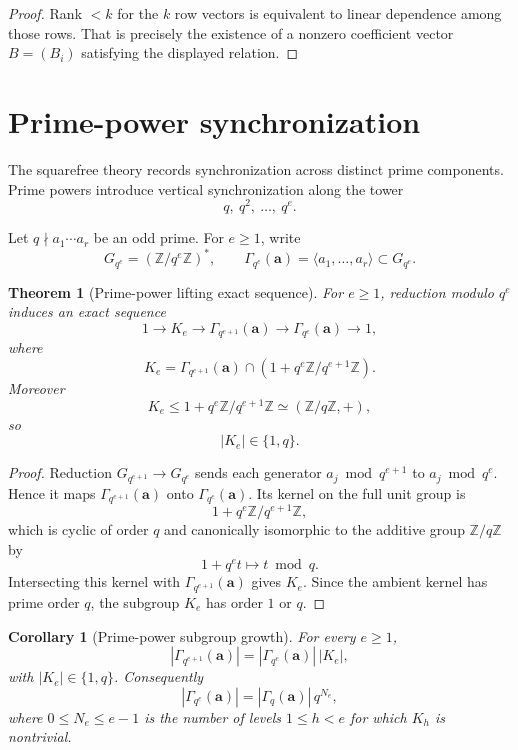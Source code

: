 \documentclass[11pt]{article}
\newtheorem{theorem}{Theorem}
\newtheorem{corollary}{Corollary}
\newcommand{\Z}{\mathbb Z}
\begin{document}
\begin{proof}
Rank \(<k\) for the \(k\) row vectors is equivalent to linear dependence among those rows.  That is precisely the existence of a nonzero coefficient vector \(B=(B_i)\) satisfying the displayed relation.
\end{proof}

\section{Prime-power synchronization}

The squarefree theory records synchronization across distinct prime components.  Prime powers introduce vertical synchronization along the tower
\[
q,\ q^2,\ \ldots,\ q^e.
\]

Let \(q\nmid a_1\cdots a_r\) be an odd prime.  For \(e\ge1\), write
\[
G_{q^e}=(\Z/q^e\Z)^*,
\qquad
\Gamma_{q^e}(\mathbf a)=\langle a_1,\ldots,a_r\rangle\subset G_{q^e}.
\]

\begin{theorem}[Prime-power lifting exact sequence]\label{T:primepower-exact}
For \(e\ge1\), reduction modulo \(q^e\) induces an exact sequence
\[
1\longrightarrow
K_e
\longrightarrow
\Gamma_{q^{e+1}}(\mathbf a)
\longrightarrow
\Gamma_{q^e}(\mathbf a)
\longrightarrow1,
\]
where
\[
K_e=\Gamma_{q^{e+1}}(\mathbf a)\cap(1+q^e\Z/q^{e+1}\Z).
\]
Moreover
\[
K_e\le 1+q^e\Z/q^{e+1}\Z\simeq(\Z/q\Z,+),
\]
so
\[
|K_e|\in\{1,q\}.
\]
\end{theorem}

\begin{proof}
Reduction \(G_{q^{e+1}}\to G_{q^e}\) sends each generator \(a_j\bmod q^{e+1}\) to \(a_j\bmod q^e\).  Hence it maps \(\Gamma_{q^{e+1}}(\mathbf a)\) onto \(\Gamma_{q^e}(\mathbf a)\).  Its kernel on the full unit group is
\[
1+q^e\Z/q^{e+1}\Z,
\]
which is cyclic of order \(q\) and canonically isomorphic to the additive group \(\Z/q\Z\) by
\[
1+q^e t\longmapsto t\bmod q.
\]
Intersecting this kernel with \(\Gamma_{q^{e+1}}(\mathbf a)\) gives \(K_e\).  Since the ambient kernel has prime order \(q\), the subgroup \(K_e\) has order \(1\) or \(q\).
\end{proof}

\begin{corollary}[Prime-power subgroup growth]\label{C:primepower-growth}
For every \(e\ge1\),
\[
|\Gamma_{q^{e+1}}(\mathbf a)|
=
|\Gamma_{q^e}(\mathbf a)|\,|K_e|,
\]
with \(|K_e|\in\{1,q\}\).  Consequently
\[
|\Gamma_{q^e}(\mathbf a)|
=
|\Gamma_q(\mathbf a)|\,q^{N_e},
\]
where \(0\le N_e\le e-1\) is the number of levels \(1\le h<e\) for which \(K_h\) is nontrivial.
\end{corollary}
\end{document}
